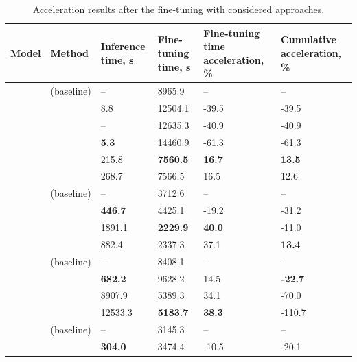 \begin{table}[!t]
    \caption{Acceleration results after the fine-tuning with considered approaches.}
    \centering 
    \footnotesize
    \begin{tabularx}{0.99\textwidth}{AA|tatt}

        \toprule

        \bfseries Model &
        \bfseries Method & 
        \bfseries Inference time, s & 
        \bfseries Fine-tuning time, s & 
        \bfseries Fine-tuning time acceleration, \% & 
        \bfseries Cumulative acceleration, \%\\
        \midrule
        & \lora{} (baseline) & -- & 8965.9 & -- & --\\
        & \uidl{} & 8.8 & 12504.1 & -39.5 & -39.5 \\
        & \lisa{} & -- & 12635.3 & -40.9 & -40.9 \\
        & \ows{} & \bfseries 5.3 & 14460.9 & -61.3 & -61.3 \\
        & \sleb{} & 215.8 & \bfseries 7560.5 & \bfseries 16.7 & \bfseries 13.5 \\
        & \shortllama{} & 268.7 & 7566.5 & 16.5 & 12.6 \\
        \midrule 
        & \lora{} (baseline) & -- & 3712.6 & -- & --\\
        & \uidl{} & \bfseries 446.7 & 4425.1 & -19.2 & -31.2 \\
        & \sleb{} & 1891.1 & \bfseries 2229.9 & \bfseries 40.0 &  -11.0 \\
        & \shortllama{} & 882.4 & 2337.3 & 37.1 & \bfseries 13.4 \\
        \midrule 
        & \lora{} (baseline) & -- & 8408.1 & -- & --\\
        & \uidl{} & \bfseries 682.2 & 9628.2 & 14.5 & \bfseries -22.7 \\
        & \sleb{} & 8907.9 &  5389.3 & 34.1 & -70.0 \\
        & \shortllama{} & 12533.3 & \bfseries 5183.7 & \bfseries 38.3 &-110.7 \\
        \midrule 
        & \lora{} (baseline) & -- & 3145.3 & -- & -- \\
        & \uidl{} & \bfseries 304.0 & 3474.4 & -10.5 & -20.1 \\

\end{tabularx}
\end{table}

